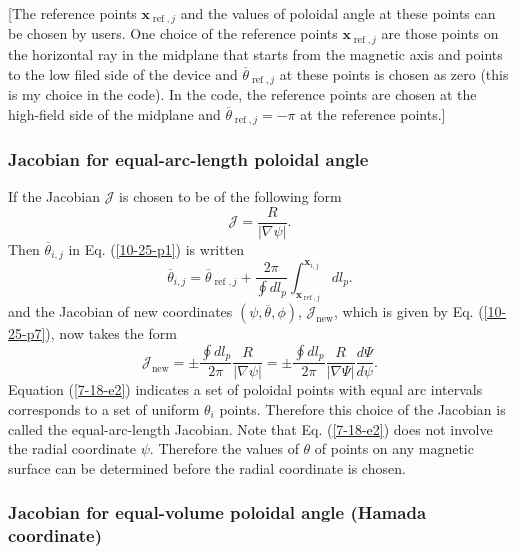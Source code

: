 \documentclass{llncs}
\newcommand{\tmop}[1]{\ensuremath{\operatorname{#1}}}
\begin{document}
[The reference points $\mathbf{x}_{\tmop{ref}, j}$ and the values of poloidal
angle at these points can be chosen by users. One choice of the reference
points $\mathbf{x}_{\tmop{ref}, j}$ are those points on the horizontal ray in
the midplane that starts from the magnetic axis and points to the low filed
side of the device and $\overline{\theta}_{\tmop{ref}, j}$ at these points is
chosen as zero (this is my choice in the {} code). In the
{} code, the reference points are chosen at the high-field side
of the midplane and $\overline{\theta}_{\tmop{ref}, j} = - \pi$ at the
reference points.]

\subsubsection{Jacobian for equal-arc-length poloidal angle}

If the Jacobian $\mathcal{J}$ is chosen to be of the following form
\begin{equation}
  \label{7-18-e1} \mathcal{J}= \frac{R}{| \nabla \psi |} .
\end{equation}
Then $\overline{\theta}_{i, j}$ in Eq. (\ref{10-25-p1}) is written
\begin{equation}
  \label{7-18-e2} \overline{\theta}_{i, j} = \overline{\theta}_{\tmop{ref}, j}
  + \frac{2 \pi}{\oint d l_p} \int_{\mathbf{x}_{\tmop{ref},
  j}}^{\mathbf{x}_{i, j}} d l_p .
\end{equation}
and the Jacobian of new coordinates $(\psi, \overline{\theta}, \phi)$,
$\mathcal{J}_{\tmop{new}}$, which is given by Eq. (\ref{10-25-p7}), now takes
the form
\begin{equation}
  \label{5-14-p1} \mathcal{J}_{\tmop{new}} = \pm \frac{\oint d l_p}{2 \pi} 
  \frac{R}{| \nabla \psi |} = \pm \frac{\oint d l_p}{2 \pi}  \frac{R}{| \nabla
  \Psi |}  \frac{d \Psi}{d \psi} .
\end{equation}
Equation (\ref{7-18-e2}) indicates a set of poloidal points with equal arc
intervals corresponds to a set of uniform $\theta_i$ points. Therefore this
choice of the Jacobian is called the equal-arc-length Jacobian. Note that Eq.
(\ref{7-18-e2}) does not involve the radial coordinate $\psi$. Therefore the
values of $\theta$ of points on any magnetic surface can be determined before
the radial coordinate is chosen.

\subsubsection{Jacobian for equal-volume poloidal angle (Hamada coordinate)}
\end{document}
